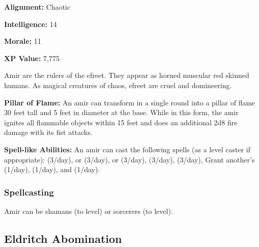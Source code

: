 \begin{multicols*}{2}
{\textbf{Alignment:} Chaotic

\textbf{Intelligence:} 14

\textbf{Morale:} 11

\textbf{XP Value:} 7,775}

Amir are the rulers of the efreet. They appear as horned muscular red skinned humans. As magical creatures of chaos, efreet are cruel and domineering.

\textbf{Pillar of Flame:} An amir can transform in a single round into a pillar of flame 30 feet tall and 5 feet in diameter at the base. While in this form, the amir ignites all flammable objects within 15 feet and does an additional 2d8 fire damage with its fist attacks.

\textbf{Spell-like Abilities:} An amir can cast the following spells (as a  level caster if appropriate):  (3/day),  or  (3/day),  or  (3/day),  (3/day),  (3/day), Grant another’s  (1/day),  (1/day), and  (1/day).

\subsubsection{Spellcasting}
Amir can be shamans (to  level) or sorcerers (to  level).

\subsection{Eldritch Abomination}
\end{multicols*}
